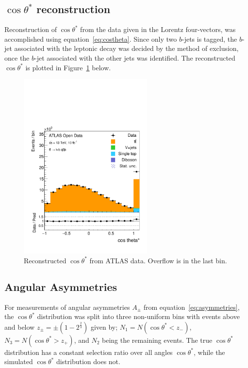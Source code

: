 \documentclass[12pt,a4paper]{article}
\numberwithin{equation}{section}
\begin{document}
\subsection{$\cos \theta^{*}$ reconstruction}
Reconstruction of $\cos \theta^{*}$ from the data given in the Lorentz four-vectors,
was accomplished using equation~\eqref{eq:costheta}. Since only two $b$-jets is
tagged, the $b$-jet associated with the leptonic decay was decided by the method
of exclusion, once the $b$-jet associated with the other jets was identified.
The reconstructed $\cos \theta^{*}$ is plotted in Figure~\ref{fig:costhetaatlas}
below.
\begin{figure}[H]
  \centering
  \includegraphics[width=0.6\textwidth]{figures/hist_costheta_overflow}
  \caption{\label{fig:costhetaatlas}Reconstructed $\cos \theta^{*}$ from ATLAS data. Overflow is in the last bin.}
\end{figure}

\subsection{Angular Asymmetries}
For measurements of angular asymmetries $A_{\pm}$ from
equation~\eqref{eq:asymmetries}, the $\cos\theta^{*}$ distribution was split into
three non-uniform bins with events above and below
$z_{\pm} = \pm(1-2^{\frac{2}{3}})$ given by; $N_1 = N(\cos \theta^{*}<z_-)$,
$N_3 = N(\cos \theta^{*}>z_+)$, and $N_2$ being the remaining events. The true
$\cos\theta^*$ distribution has a constant selection ratio over all angles $\cos\theta^*$,
while the simulated $\cos\theta^*$ distribution does not.\\
\end{document}
